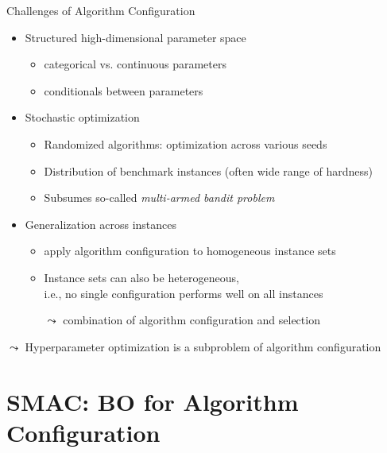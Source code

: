 \begin{frame}[c]{Challenges of Algorithm Configuration}

\begin{itemize}
\item \alert{Structured high-dimensional parameter space}
\begin{itemize}
\item categorical vs. continuous parameters
\item conditionals between parameters
\end{itemize}
\pause
\medskip
\item \alert{Stochastic optimization}
\begin{itemize}
\item Randomized algorithms: optimization across various seeds
\item Distribution of benchmark instances (often wide range of hardness)
\item Subsumes so-called \emph{multi-armed bandit problem}
\end{itemize}
\pause
\medskip
\item \alert{Generalization across instances}
\begin{itemize}
	\item apply algorithm configuration to \alert{homogeneous} instance sets
	\item Instance sets can also be \alert{heterogeneous},\\i.e., no single configuration performs well on all instances\\ 
	\item[$\leadsto$] combination of algorithm configuration and selection
\end{itemize}

\end{itemize}

\pause
\medskip
$\leadsto$ Hyperparameter optimization is a subproblem of algorithm configuration

\end{frame}


\section{SMAC: BO for Algorithm Configuration}

